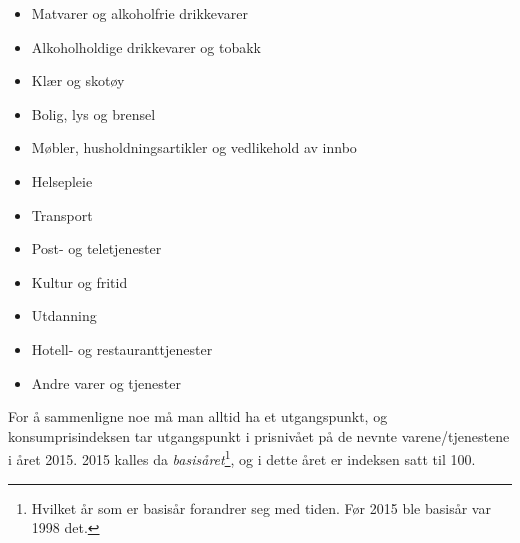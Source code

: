 \parbox[t]{0.49\linewidth}{\begin{itemize}
		\item Matvarer og alkoholfrie drikkevarer
		\item Alkoholholdige drikkevarer og tobakk
		\item Klær og skotøy
		\item Bolig, lys og brensel
		\item Møbler, husholdningsartikler og vedlikehold av innbo
		\item Helsepleie
\end{itemize}}
\parbox[t]{0.49\linewidth}{\begin{itemize}
		\item Transport
		\item Post- og teletjenester
		\item Kultur og fritid
		\item Utdanning
		\item Hotell- og restauranttjenester
		\item Andre varer og tjenester
\end{itemize}}
For å sammenligne noe må man alltid ha et utgangspunkt, og konsumprisindeksen tar utgangspunkt i prisnivået på de nevnte varene/tjenestene i året 2015. 2015 kalles da \textit{basisåret}\footnote{Hvilket år som er basisår forandrer seg med tiden. Før 2015 ble basisår var 1998 det.}, og i dette året er indeksen satt til 100.\regv
{}\vsk

